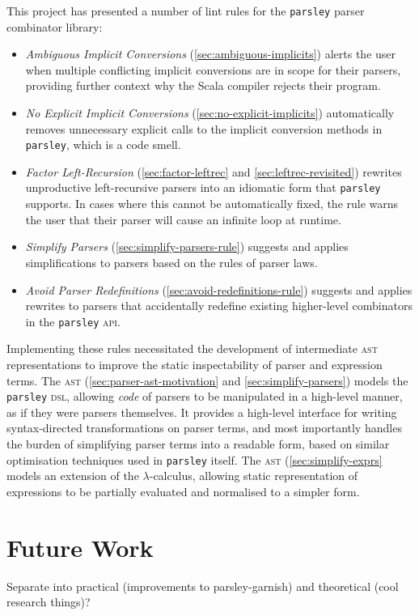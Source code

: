 \documentclass[../../main.tex]{subfiles}
\begin{document}
This project has presented a number of lint rules for the \texttt{parsley} parser combinator library:
\begin{itemize}
  \item \emph{Ambiguous Implicit Conversions} (\cref{sec:ambiguous-implicits}) alerts the user when multiple conflicting implicit conversions are in scope for their parsers, providing further context why the Scala compiler rejects their program.
  \item \emph{No Explicit Implicit Conversions} (\cref{sec:no-explicit-implicits}) automatically removes unnecessary explicit calls to the implicit conversion methods in \texttt{parsley}, which is a code smell.
  \item \emph{Factor Left-Recursion} (\cref{sec:factor-leftrec} and \cref{sec:leftrec-revisited}) rewrites unproductive left-recursive parsers into an idiomatic form that \texttt{parsley} supports. In cases where this cannot be automatically fixed, the rule warns the user that their parser will cause an infinite loop at runtime.
  \item \emph{Simplify Parsers} (\cref{sec:simplify-parsers-rule}) suggests and applies simplifications to parsers based on the rules of parser laws.
  \item \emph{Avoid Parser Redefinitions} (\cref{sec:avoid-redefinitions-rule}) suggests and applies rewrites to parsers that accidentally redefine existing higher-level combinators in the \texttt{parsley} \textsc{api}.
\end{itemize}
%
Implementing these rules necessitated the development of intermediate \textsc{ast} representations to improve the static inspectability of parser and expression terms.
The  \textsc{ast} (\cref{sec:parser-ast-motivation} and \cref{sec:simplify-parsers}) models the \texttt{parsley} \textsc{dsl}, allowing \emph{code} of parsers to be manipulated in a high-level manner, as if they were parsers themselves.
It provides a high-level interface for writing syntax-directed transformations on parser terms, and most importantly handles the burden of simplifying parser terms into a readable form, based on similar optimisation techniques used in \texttt{parsley} itself.
The  \textsc{ast} (\cref{sec:simplify-exprs} models an extension of the $\lambda$-calculus, allowing static representation of expressions to be partially evaluated and normalised to a simpler form.

\section{Future Work}
Separate into practical (improvements to parsley-garnish) and theoretical (cool research things)?
\end{document}
